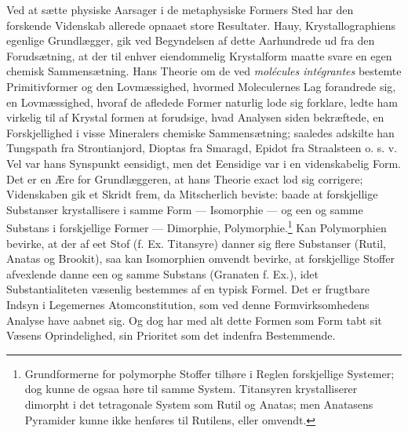 \documentclass[12pt,a4paper]{book}
\begin{document}
Ved at sætte physiske Aarsager i de metaphysiske Formers Sted har den
forskende Videnskab allerede opnaaet store Resultater. Hauy,
Krystallographiens egenlige Grundlægger, gik ved Begyndelsen af dette
Aarhundrede ud fra den Forudsætning, at der til enhver eiendommelig
Krystalform maatte svare en egen chemisk Sammensætning. Hans Theorie om
de ved \textit{molécules intégrantes} bestemte Primitivformer og den
Lovmæssighed, hvormed Moleculernes Lag forandrede sig, en Lovmæssighed,
hvoraf de afledede Former naturlig lode sig forklare, ledte ham virkelig
til af Krystal\-%
formen at forudsige, hvad Analysen siden bekræftede, en Forskjellighed i
visse Mineralers chemiske Sammensætning; saaledes adskilte han
Tungspath fra Strontianjord, Dioptas fra Smaragd, Epidot fra Straalsteen
o. s. v. Vel var hans Synspunkt eensidigt, men det Eensidige var i en
videnskabelig Form. Det er en Ære for Grundlæggeren, at hans Theorie
exact lod sig corrigere; Videnskaben gik et Skridt frem, da Mitscherlich
beviste: baade at forskjellige Substanser krystallisere i samme
Form --- Isomorphie --- og een og samme Substans i forskjellige
Former --- Dimorphie, Polymorphie.\footnote{%
Grundformerne for polymorphe Stoffer tilhøre i Reglen forskjellige
Systemer; dog kunne de ogsaa høre til samme System. Titansyren
krystalliserer dimorpht i det tetragonale System som Rutil og Anatas;
men Anatasens Pyramider kunne ikke henføres til Rutilens, eller
omvendt.} Kan Polymorphien bevirke, at der af eet Stof (f. Ex.
Titansyre) danner sig flere Substanser (Rutil, Anatas og Brookit), saa
kan Isomorphien omvendt bevirke, at forskjellige Stoffer afvexlende
danne een og samme Substans (Granaten f. Ex.), idet Substantialiteten
væsenlig bestemmes af en typisk Formel. Det er frugtbare Indsyn i
Legemernes Atomconstitution, som ved denne Formvirksomhedens Analyse
have aabnet sig. Og dog har med alt dette Formen som Form tabt sit
Væsens Oprindelighed, sin Prioritet som det indenfra Bestemmende.
\end{document}
